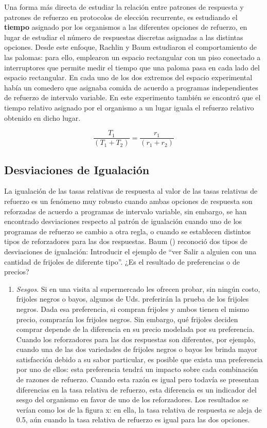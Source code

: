 \documentclass[
  letterpaper,
]{book}
\providecommand{\tightlist}{%
  \setlength{\itemsep}{0pt}\setlength{\parskip}{0pt}}\usepackage{longtable,booktabs,array}
\begin{document}
Una forma más directa de estudiar la relación entre patrones de
respuesta y patrones de refuerzo en protocolos de elección recurrente,
es estudiando el \textbf{tiempo} asignado por los organismos a las
diferentes opciones de refuerzo, en lugar de estudiar el número de
respuestas discretas asignadas a las distintas opciones. Desde este
enfoque, Rachlin y Baum estudiaron el comportamiento de las palomas:
para ello, emplearon un espacio rectangular con un piso conectado a
interruptores que permite medir el tiempo que una paloma pasa en cada
lado del espacio rectangular. En cada uno de los dos extremos del
espacio experimental había un comedero que asignaba comida de acuerdo a
programas independientes de refuerzo de intervalo variable. En este
experimento también se encontró que el tiempo relativo asignado por el
organismo a un lugar iguala el refuerzo relativo obtenido en dicho
lugar.

\[
\frac {T_1} {(T_1 + T_2)} = \frac {r_1} {(r_1 + r_2)}
\]

\subsection{Desviaciones de
Igualación}\label{desviaciones-de-igualaciuxf3n}

La igualación de las tasas relativas de respuesta al valor de las tasas
relativas de refuerzo es un fenómeno muy robusto cuando ambas opciones
de respuesta son reforzadas de acuerdo a programas de intervalo
variable, sin embargo, se han encontrado desviaciones respecto al patrón
de igualación cuando uno de los programas de refuerzo se cambio a otra
regla, o cuando se establecen distintos tipos de reforzadores para las
dos respuestas. Baum () reconoció dos tipos de desviaciones de
igualación: Introducir el ejemplo de ``ver Salir a alguien con una
cantidad de frijoles de diferente tipo''. ¿Es el resultado de
preferencias o de precios?

\begin{enumerate}
\def\labelenumi{\arabic{enumi}.}
\tightlist
\item
  \emph{Sesgos}. Si en una visita al supermercado les ofrecen probar,
  sin ningún costo, frijoles negros o bayos, algunos de Uds. preferirán
  la prueba de los frijoles negros. Dada esa preferencia, si compran
  frijoles y ambos tienen el mismo precio, comprarán los frijoles
  negros. Sin embargo, qué frijoles deciden comprar depende de la
  diferencia en su precio modelada por su preferencia. Cuando los
  reforzadores para las dos respuestas son diferentes, por ejemplo,
  cuando una de las dos variedades de frijoles negros o bayos les brinda
  mayor satisfacción debido a su sabor particular, es posible que exista
  una preferencia por uno de ellos: esta preferencia tendrá un impacto
  sobre cada combinación de razones de refuerzo. Cuando esta razón es
  igual pero todavía se presentan diferencias en la tasa relativa de
  refuerzo, esta diferencia es un indicador del sesgo del organismo en
  favor de uno de los reforzadores. Los resultados se verían como los de
  la figura x: en ella, la tasa relativa de respuesta se aleja de 0.5,
  aún cuando la tasa relativa de refuerzo es igual para las dos
  opciones.
\end{enumerate}
\end{document}
